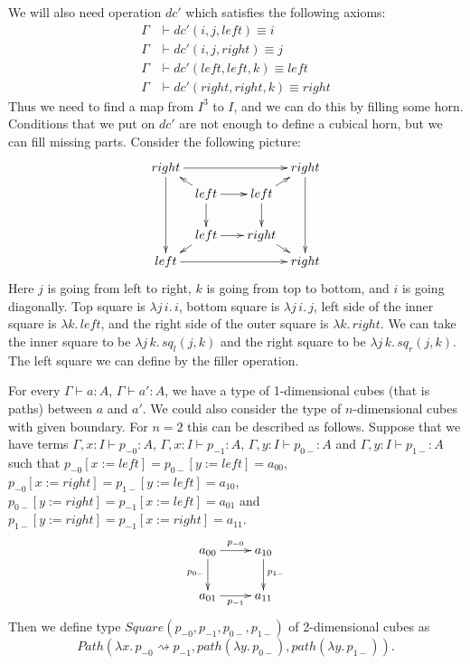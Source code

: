 \documentclass{mscs}
\newcommand{\deq}{\equiv}
\newcommand{\repl}{:=}
\newcommand{\idtype}{\rightsquigarrow}
\numberwithin{figure}{section}
\begin{document}
We will also need operation $dc'$ which satisfies the following axioms:
\begin{align*}
\Gamma & \vdash dc'(i,j,left) \deq i \\
\Gamma & \vdash dc'(i,j,right) \deq j \\
\Gamma & \vdash dc'(left,left,k) \deq left \\
\Gamma & \vdash dc'(right,right,k) \deq right
\end{align*}
Thus we need to find a map from $I^3$ to $I$, and we can do this by filling some horn.
Conditions that we put on $dc'$ are not enough to define a cubical horn, but we can fill missing parts.
Consider the following picture:
\[ \xymatrix @C=0.5pc @R=0.5pc
    { right \ar[rrrr] \ar[dddd] &         & &                      & right \ar[dddd] \\
           & left \ar[rr] \ar[dd] \ar[ul] & & left \ar[dd] \ar[ur] & \\
           &                              & &                      & \\
           & left \ar[rr] \ar[dl]         & & right \ar[dr]        & \\
      left \ar[rrrr]           &          & &                      & right
    }\]
Here $j$ is going from left to right, $k$ is going from top to bottom, and $i$ is going diagonally.
Top square is $\lambda j\,i.\,i$, bottom square is $\lambda j\,i.\,j$, left side of the inner square is $\lambda k.\,left$,
and the right side of the outer square is $\lambda k.\,right$.
We can take the inner square to be $\lambda j\,k.\,sq_l(j,k)$ and the right square to be $\lambda j\,k.\,sq_r(j,k)$.
The left square we can define by the filler operation.

For every $\Gamma \vdash a : A$, $\Gamma \vdash a' : A$, we have a type of 1-dimensional cubes (that is paths) between $a$ and $a'$.
We could also consider the type of $n$-dimensional cubes with given boundary.
For $n = 2$ this can be described as follows.
Suppose that we have terms $\Gamma, x : I \vdash p_{-0} : A$, $\Gamma, x : I \vdash p_{-1} : A$, $\Gamma, y : I \vdash p_{0-} : A$ and $\Gamma, y : I \vdash p_{1-} : A$
such that $p_{-0}[x \repl left] = p_{0-}[y \repl left] = a_{00}$, $p_{-0}[x \repl right] = p_{1-}[y \repl left] = a_{10}$,
$p_{0-}[y \repl right] = p_{-1}[x \repl left] = a_{01}$ and $p_{1-}[y \repl right] = p_{-1}[x \repl right] = a_{11}$.
\[ \xymatrix{ a_{00} \ar[r]^{p_{-0}} \ar[d]_{p_{0-}} & a_{10} \ar[d]^{p_{1-}} \\
              a_{01} \ar[r]_{p_{-1}}                 & a_{11}
            } \]
Then we define type $Square(p_{-0},p_{-1},p_{0-},p_{1-})$ of 2-dimensional cubes as
\[ Path(\lambda x.\,p_{-0} \idtype p_{-1}, path(\lambda y.\,p_{0-}), path(\lambda y.\,p_{1-})). \]
\end{document}
